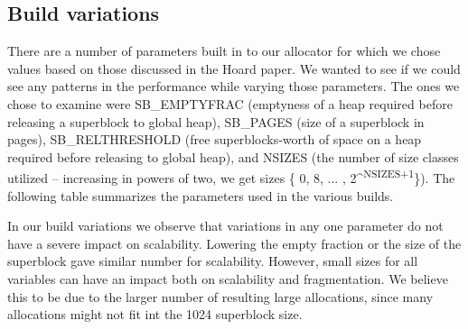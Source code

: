 \documentclass{article}
\begin{document}
\subsection{Build variations}
There are a number of parameters built in to our allocator for which we chose
values based on those discussed in the Hoard paper. We wanted to see if we
could see any patterns in the performance while varying those parameters. The
ones we chose to examine were SB\_EMPTYFRAC (emptyness of a heap required
before releasing a superblock to global heap), SB\_PAGES (size of a superblock
in pages), SB\_RELTHRESHOLD (free superblocks-worth of space on a heap required
before releasing to global heap), and NSIZES (the number of size classes
utilized -- increasing in powers of two, we get sizes \{ 0, 8, ... ,
2\^{}\textsuperscript{NSIZES+1}\}). The following table summarizes the parameters
used in the various builds.

In our build variations we observe that variations in any one parameter do not 
have a severe impact on scalability. Lowering the empty fraction or the size of 
the superblock gave similar number for scalability. However, small sizes for all
variables can have an impact both on scalability and fragmentation. We believe
this to be due to the larger number of resulting large allocations, since many 
allocations might not fit int the 1024 superblock size.
\end{document}
